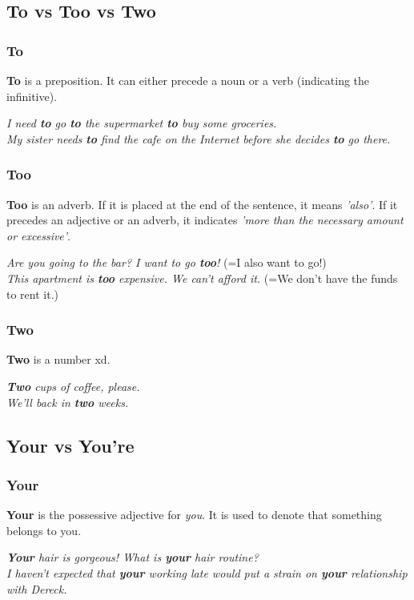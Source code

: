 \documentclass[hidelinks,10pt,a4paper]{article}
\begin{document}
\subsection{To vs Too vs Two}
\subsubsection{To}
\textbf{To} is a preposition. It can either precede a noun or a verb (indicating the infinitive).
\begin{center}
	\textit{I need \textbf{to} go \textbf{to} the supermarket \textbf{to} buy some groceries.}\\
	\textit{My sister needs \textbf{to} find the cafe on the Internet before she decides \textbf{to} go there.}
\end{center}

\subsubsection{Too}
\textbf{Too} is an adverb. If it is placed at the end of the sentence, it means \textit{'also'}. If it precedes an adjective or an adverb, it indicates \textit{'more than the necessary amount or excessive'}.

\begin{center}
	\textit{Are you going to the bar? I want to go \textbf{too}!} (=I also want to go!)\\
	\textit{This apartment is \textbf{too} expensive. We can't afford it.} (=We don't have the funds to rent it.)
\end{center}

\subsubsection{Two}
\textbf{Two} is a number xd.
\begin{center}
	\textit{\textbf{Two} cups of coffee, please.}\\
	\textit{We'll back in \textbf{two} weeks.}
\end{center}

\subsection{Your vs You're}
\subsubsection{Your}
\textbf{Your} is the possessive adjective for \textit{you}. It is used to denote that something belongs to you.
\begin{center}
	\textit{\textbf{Your} hair is gorgeous! What is \textbf{your} hair routine?}\\
	\textit{I haven't expected that \textbf{your} working late would put a strain on \textbf{your} relationship with Dereck.}
\end{center}
\end{document}
